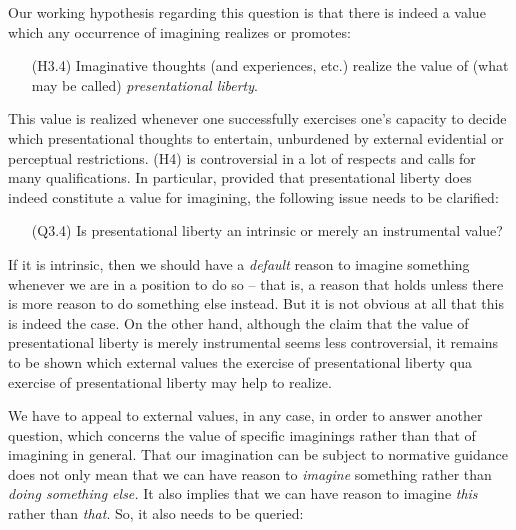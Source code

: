 \noindent Our working hypothesis regarding this question is that there is indeed a value which any occurrence of imagining realizes or promotes:

\vspace{-.1cm}
\begin{itemize}[leftmargin=2cm]
\item[(H3.4)] Imaginative thoughts (and experiences, etc.) realize the value of (what may be called) \emph{presentational liberty}.
\end{itemize}
\vspace{-.1cm}

\noindent This value is realized whenever one successfully exercises one's capacity to decide which presentational thoughts to entertain, unburdened by external evidential or perceptual restrictions. (H4) is controversial in a lot of respects and calls for many qualifications. In particular, provided that presentational liberty does indeed constitute a value for imagining, the following issue needs to be clarified:

\vspace{-.1cm}
\begin{itemize}[leftmargin=2cm]
\item[(Q3.4)] Is presentational liberty an intrinsic or merely an instrumental value?
\end{itemize}
\vspace{-.1cm}

\noindent If it is intrinsic, then we should have a \emph{default} reason to imagine something whenever we are in a position to do so -- that is, a reason that holds unless there is more reason to do something else instead. But it is not obvious at all that this is indeed the case. On the other hand, although the claim that the value of presentational liberty is merely instrumental seems less controversial, it remains to be shown which external values the exercise of presentational liberty qua exercise of presentational liberty may help to realize.

We have to appeal to external values, in any case, in order to answer another question, which concerns the value of specific imaginings rather than that of imagining in general. That our imagination can be subject to normative guidance does not only mean that we can have reason to \emph{imagine} something rather than \emph{doing something else.} It also implies that we can have reason to imagine \emph{this} rather than \emph{that}. So, it also needs to be queried:

